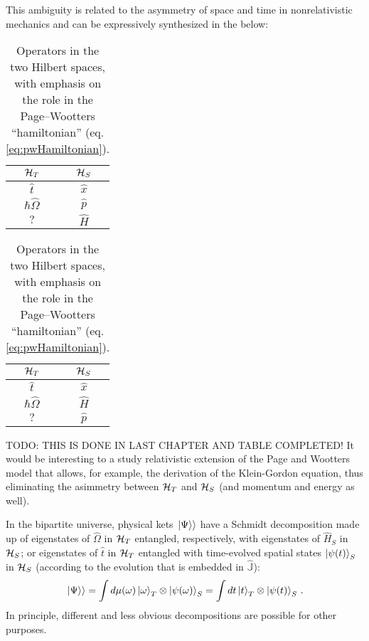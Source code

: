 This ambiguity is related to the a\-sym\-me\-try of space and time in
non\-re\-la\-ti\-vi\-stic
mechanics and can be expressively synthesized in the below:
{
  \begin{table}[h!]
    \parbox{.45\linewidth}{
      \centering
      \begin{tabular}{c|c}
        $\mathcal{H}_T$        & $\mathcal{H}_S$  \\
        \hline
        \hline
        $\hat{t}$           & $\hat{x}$     \\
        \hline
        $\hbar\hat{\Omega}$ & $\hat{p}$     \\
        \hline
        $?$                 & $\hat{H}$
      \end{tabular}
      {\caption{
        Operators in the two Hilbert spaces,
        with emphasis on the algebraic relation
        to other operators in the same space.
      }\label{op_comparison_alg}}
    }
    \hfill
    \parbox{.45\linewidth}{
      \centering
      \begin{tabular}{c|c}
        $\mathcal{H}_T$        & $\mathcal{H}_S$  \\
        \hline
        \hline
        $\hat{t}$           & $\hat{x}$     \\
        \hline
        $\hbar\hat{\Omega}$ & $\hat{H}$     \\
        \hline
        $?$                 & $\hat{p}$
      \end{tabular}
      {\caption{
        Operators in the two Hilbert spaces,
        with emphasis on the role in the
        Page--Wootters ``hamiltonian'' (eq. \ref{eq:pwHamiltonian}).
      }\label{op_comparison_J}}
    }
  \end{table}
}

TODO: THIS IS DONE IN LAST CHAPTER AND TABLE COMPLETED!
It would be interesting to a study relativistic extension of the
Page and Wootters model that allows, for example, the derivation of the Klein-Gordon
equation, thus eliminating the asimmetry between
$\mathcal{H}_T$ and $\mathcal{H}_S$ (and momentum and energy as well).

In the bipartite universe, physical kets $\left.\left| \Psi \right\rangle\right\rangle$ have a Schmidt decomposition
made up of
eigenstates of $\hat{\Omega}$ in $\mathcal{H}_T$
entangled, respectively, with
eigenstates of $\hat{H}_S$ in $\mathcal{H}_S$;
or eigenstates of $\hat{t}$ in $\mathcal{H}_T$
entangled with time-evolved spatial states $\ket{\psi(t)}_S$ in $\mathcal{H}_S$
(according to the evolution that is embedded in $\hat{\mathbb{J}}$):
\begin{equation}
  \left.\left| \Psi \right\rangle\right\rangle = \int d\mu(\omega) \ket{\omega}_{T}\otimes\ket{\psi(\omega)}_{S} = \int dt \ket{t}_{T} \otimes \ket{\psi(t)}_{S}\,\text{.} 
\end{equation}
In principle, different and less obvious decompositions are possible for other purposes.


